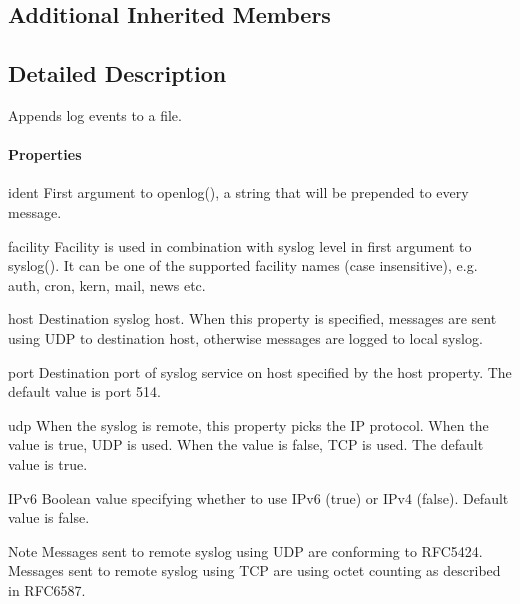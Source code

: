 \subsection*{Additional Inherited Members}


\subsection{Detailed Description}
Appends log events to a file.

\paragraph*{Properties}


\begin{DoxyDescription}
\item[{\ttfamily ident} ]First argument to {\ttfamily openlog()}, a string that will be prepended to every message.


\item[{\ttfamily facility} ]Facility is used in combination with syslog level in first argument to syslog(). It can be one of the supported facility names (case insensitive), e.\-g. auth, cron, kern, mail, news etc.


\item[{\ttfamily host} ]Destination syslog host. When this property is specified, messages are sent using U\-D\-P to destination host, otherwise messages are logged to local syslog.


\item[{\ttfamily port} ]Destination port of syslog service on host specified by the {\ttfamily host} property. The default value is port 514.


\item[{\ttfamily udp} ]When the syslog is remote, this property picks the I\-P protocol. When the value is true, U\-D\-P is used. When the value is false, T\-C\-P is used. The default value is true.


\item[{\ttfamily I\-Pv6} ]Boolean value specifying whether to use I\-Pv6 (true) or I\-Pv4 (false). Default value is false.


\end{DoxyDescription}

\begin{DoxyNote}{Note}
Messages sent to remote syslog using U\-D\-P are conforming to R\-F\-C5424. Messages sent to remote syslog using T\-C\-P are using octet counting as described in R\-F\-C6587. 
\end{DoxyNote}


